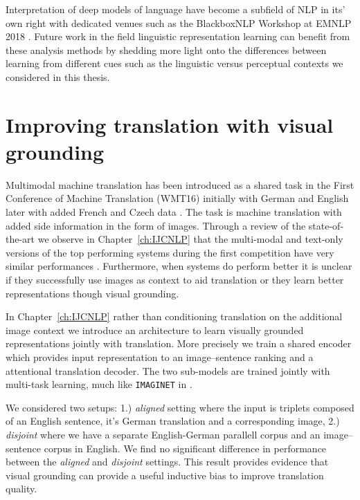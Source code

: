 Interpretation of deep models of language have become a subfield of NLP in its' own right
with dedicated venues such as the BlackboxNLP Workshop at EMNLP 2018
\citep{alishahi2019analyzing}. Future work in the field linguistic representation learning
can benefit from these analysis methods by shedding more light onto the differences between
learning from different cues such as the linguistic versus perceptual contexts we considered in 
this thesis.



\section{Improving translation with visual grounding}

Multimodal machine translation has been introduced as a shared task \citep{specia2016shared} in the
First Conference of Machine Translation (WMT16) initially with German and English  \citep{elliott2016multi30k}
later with added French and Czech data \citep{elliott2017findings}. The task is 
machine translation with added side information in the form of images. 
Through a review of the state-of-the-art we observe in Chapter~\ref{ch:IJCNLP} 
that the multi-modal and text-only versions of 
the top performing systems during the first competition
have very similar performances \citep{specia2016observed}. 
Furthermore, when systems do perform better it is unclear if they successfully use images as 
context to aid translation or they learn better representations though visual grounding.

In Chapter~\ref{ch:IJCNLP} rather than conditioning translation on the additional image context we 
introduce an architecture to learn visually grounded representations jointly with translation.
More precisely we train a shared
encoder which provides input representation to an image--sentence ranking and a
attentional translation decoder. The two sub-models are trained jointly with multi-task learning, much
like \texttt{IMAGINET} in \cite{chrupala2015learning}.

We considered two setups:
1.) \emph{aligned} setting where the input is triplets composed of an English sentence, 
it's German translation and a corresponding image, 2.) \emph{disjoint} where we have a
separate English-German parallell corpus and an image--sentence corpus in English.
We find no significant difference in performance between the \emph{aligned} and \emph{disjoint}
settings. This result provides evidence that visual grounding can provide a useful inductive bias to 
improve translation quality.

